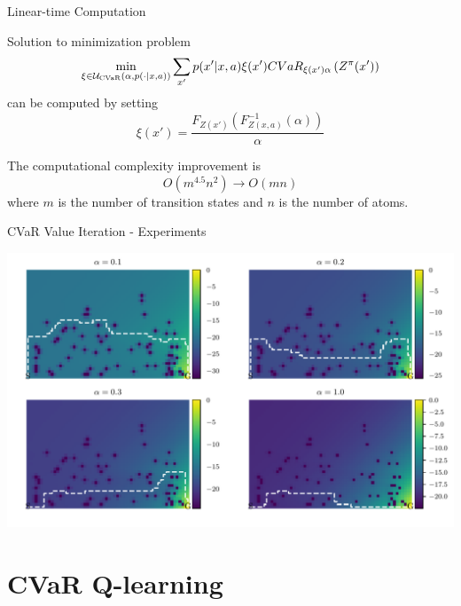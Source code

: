 \documentclass{beamer}
\begin{document}
\begin{frame}{Linear-time Computation}

\begin{theorem}
Solution to minimization problem 
$$\min_{\xi \in \mathcal{U}_{\text{CVaR}}(\alpha, p(\cdot | x, a))} \sum_{x'} p(x'| x, a)\xi(x') CVaR_{\xi(x')\alpha}\left( {Z^\pi(x')} \right)$$
can be computed by setting
$$\xi ( x' ) = \dfrac{F_{Z(x')}(F^{-1}_{Z(x,a)}(\alpha))}{\alpha} $$
\end{theorem}

The computational complexity improvement is $$O(m^{4.5} n^2)\to O(m  n)$$ where $m$ is the number of transition states and $n$ is the number of atoms.

\end{frame}


\begin{frame}{CVaR Value Iteration - Experiments}

\center
\includegraphics[width=\linewidth]{../gfx/vi_optimal_paths.pdf}

\end{frame}

\section{CVaR Q-learning}

%
%
%
\end{document}
